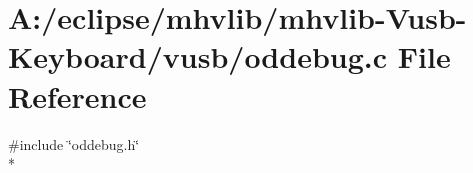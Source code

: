 \hypertarget{mhvlib-_vusb-_keyboard_2vusb_2oddebug_8c}{\section{A\-:/eclipse/mhvlib/mhvlib-\/\-Vusb-\/\-Keyboard/vusb/oddebug.c File Reference}
\label{mhvlib-_vusb-_keyboard_2vusb_2oddebug_8c}
}
{\ttfamily \#include \char`\"{}oddebug.\-h\char`\"{}}\\*
